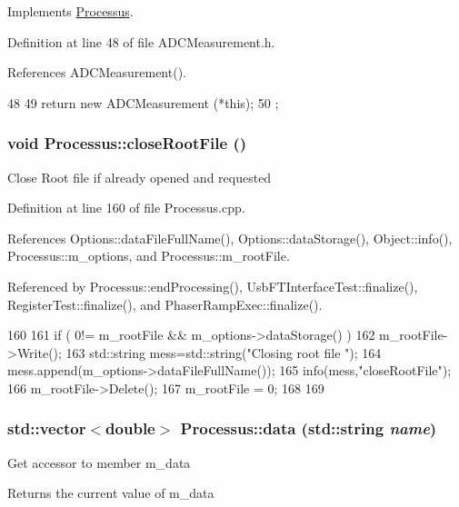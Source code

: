 Implements \hyperlink{classProcessus_aca8856f6d6d7b7e1fe941f298dcbb502}{Processus}.

Definition at line 48 of file ADCMeasurement.h.

References ADCMeasurement().


\begin{DoxyCode}
48                          {
49     return new ADCMeasurement (*this);
50   };
\end{DoxyCode}
\hypertarget{classProcessus_a2f3c41e99da4c738ea3d8f7b0d20a665}{
\subsubsection[{closeRootFile}]{\setlength{\rightskip}{0pt plus 5cm}void Processus::closeRootFile ()}}
\label{classProcessus_a2f3c41e99da4c738ea3d8f7b0d20a665}
Close Root file if already opened and requested 

Definition at line 160 of file Processus.cpp.

References Options::dataFileFullName(), Options::dataStorage(), Object::info(), Processus::m\_\-options, and Processus::m\_\-rootFile.

Referenced by Processus::endProcessing(), UsbFTInterfaceTest::finalize(), RegisterTest::finalize(), and PhaserRampExec::finalize().


\begin{DoxyCode}
160                                 {
161   if ( 0!= m_rootFile && m_options->dataStorage() ){
162     m_rootFile->Write();
163         std::string mess=std::string("Closing root file ");
164         mess.append(m_options->dataFileFullName());
165         info(mess,"closeRootFile");
166     m_rootFile->Delete();
167     m_rootFile = 0;
168   }
169 }
\end{DoxyCode}
\hypertarget{classProcessus_abf4d91fb36707e1d50178bab12d21ae9}{
\subsubsection[{data}]{\setlength{\rightskip}{0pt plus 5cm}std::vector$<$double$>$ Processus::data (std::string {\em name})}}
\label{classProcessus_abf4d91fb36707e1d50178bab12d21ae9}
Get accessor to member m\_\-data \begin{DoxyReturn}{Returns}
the current value of m\_\-data 
\end{DoxyReturn}


